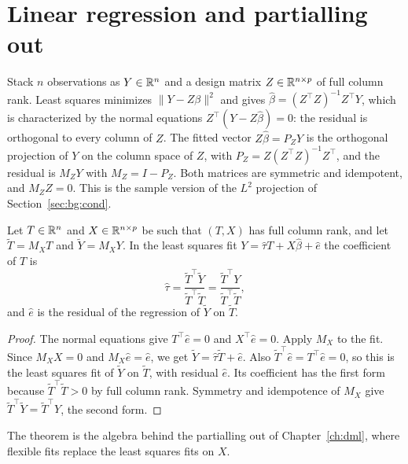 \section{Linear regression and partialling out}\label{sec:bg:ols}



Stack $n$ observations as $Y \in \mathbb{R}^n$ and a design matrix $Z \in \mathbb{R}^{n \times p}$ of full column rank. Least squares minimizes $\|Y - Z\beta\|^2$ and gives $\hat\beta = (Z^\top Z)^{-1}Z^\top Y$, which is characterized by the normal equations $Z^\top(Y - Z\hat\beta) = 0$: the residual is orthogonal to every column of $Z$. The fitted vector $Z\hat\beta = P_ZY$ is the orthogonal projection of $Y$ on the column space of $Z$, with $P_Z = Z(Z^\top Z)^{-1}Z^\top$, and the residual is $M_ZY$ with $M_Z = I - P_Z$. Both matrices are symmetric and idempotent, and $M_ZZ = 0$. This is the sample version of the $L^2$ projection of Section~\ref{sec:bg:cond}.

\begin{theorem}\label{thm:bg:fwl}
Let $T \in \mathbb{R}^n$ and $X \in \mathbb{R}^{n \times p}$ be such that $(T, X)$ has full column rank, and let $\tilde T = M_XT$ and $\tilde Y = M_XY$. In the least squares fit $Y = \hat\tau T + X\hat\beta + \hat e$ the coefficient of $T$ is
\[
\hat\tau = \frac{\tilde T^\top\tilde Y}{\tilde T^\top\tilde T} = \frac{\tilde T^\top Y}{\tilde T^\top\tilde T},
\]
and $\hat e$ is the residual of the regression of $\tilde Y$ on $\tilde T$.
\end{theorem}

\begin{proof}
The normal equations give $T^\top\hat e = 0$ and $X^\top\hat e = 0$. Apply $M_X$ to the fit. Since $M_XX = 0$ and $M_X\hat e = \hat e$, we get $\tilde Y = \hat\tau\tilde T + \hat e$. Also $\tilde T^\top\hat e = T^\top\hat e = 0$, so this is the least squares fit of $\tilde Y$ on $\tilde T$, with residual $\hat e$. Its coefficient has the first form because $\tilde T^\top\tilde T > 0$ by full column rank. Symmetry and idempotence of $M_X$ give $\tilde T^\top\tilde Y = \tilde T^\top Y$, the second form.
\end{proof}

The theorem is the algebra behind the partialling out of Chapter~\ref{ch:dml}, where flexible fits replace the least squares fits on $X$. 

